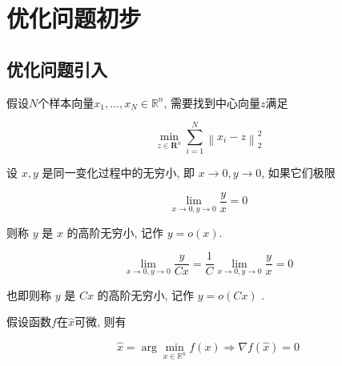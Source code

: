 \chapter{优化问题初步}
    
\section{优化问题引入}

\begin{problem}
    \label{Problem:ClusteringCenter}
    假设$N$个样本向量$ x_{1}, \ldots, x_{N} \in \mathbb{R}^{n} $, 需要找到中心向量$z$满足

    $$ \min _{z \in \mathbf{R}^{n}} \sum_{i=1}^{N}\left\|x_{i}-z\right\|_{2}^{2} $$
\end{problem}

\begin{definition}[高阶无穷小记号 $o$]
    设 $ x, y $ 是同一变化过程中的无穷小, 即 $ x \rightarrow 0, y \rightarrow 0 $, 如果它们极限

$$
\lim_{x \rightarrow 0, y \rightarrow 0} \frac{y}{x}=0
$$

则称 $ y $ 是 $ x $ 的高阶无穷小, 记作 $ y=o(x) $.
\end{definition}

\begin{corollary}
    $$ \lim_{x \rightarrow 0, y \rightarrow 0} \frac{y}{C x}=\frac{1}{C} \lim_{x \rightarrow 0, y \rightarrow 0} \frac{y}{x}=0 $$

    也即则称 $ y $ 是 $ C x $ 的高阶无穷小, 记作 $ y=o(C x) $ . 
\end{corollary}

\begin{theorem}[优化求解的必要条件]
    假设函数$f$在$\hat{x}$可微, 则有

    $$ \hat{x}=\arg \min _{x \in \mathbb{R}^{n}} f(x) \Rightarrow \nabla f(\hat{x})=0 $$
\end{theorem}

